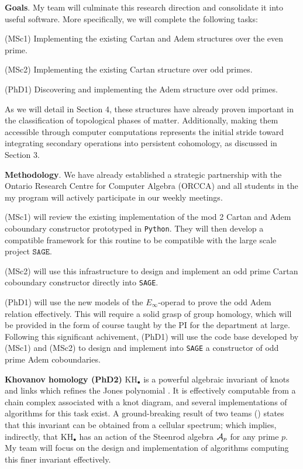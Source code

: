 \medskip\noindent\textbf{Goals}.
My team will culminate this research direction and consolidate it into useful software.
More specifically, we will complete the following tasks:

\smallskip\noindent(MSc1) Implementing the existing Cartan and Adem structures over the even prime.\par
\noindent(MSc2) Implementing the existing Cartan structure over odd primes.\par
\noindent(PhD1) Discovering and implementing the Adem structure over odd primes.

\smallskip\noindent As we will detail in Section 4, these structures have already proven important in the classification of topological phases of matter.
Additionally, making them accessible through computer computations represents the initial stride toward integrating secondary operations into persistent cohomology, as discussed in Section 3.

\smallskip\noindent\textbf{Methodology}.
We have already established a strategic partnership with the Ontario Research Centre for Computer Algebra (ORCCA) and all students in the my program will actively participate in our weekly meetings.

(MSc1) will review the existing implementation of the mod 2 Cartan and Adem coboundary constructor prototyped in \texttt{Python}.
They will then develop a compatible framework for this routine to be compatible with the large scale project $\texttt{SAGE}$.

(MSc2) will use this infrastructure to design and implement an odd prime Cartan coboundary constructor directly into \texttt{SAGE}.

(PhD1) will use the new models of the $E_\infty$-operad \cite{medina2020prop1} to prove the odd Adem relation effectively.
This will require a solid grasp of group homology, which will be provided in the form of course taught by the PI for the department at large.
Following this significant achivement, (PhD1) will use the code base developed by (MSc1) and (MSc2) to design and implement into \texttt{SAGE} a constructor of odd prime Adem coboundaries.

\medskip\noindent\textbf{{\sc Khovanov homology} (PhD2)}
$\mathrm{KH_\bullet}$ is a powerful algebraic invariant of knots and links which refines the Jones polynomial \cite{khovanov2000khovanov}.
It is effectively computable from a chain complex associated with a knot diagram, and several implementations of algorithms for this task exist.
A ground-breaking result of two teams (\cite{lipshitz2014khovanov,kriz2016khovanov}) states that this invariant can be obtained from a cellular spectrum; which implies, indirectly, that $\mathrm{KH_\bullet}$ has an action of the Steenrod algebra $\mathcal{A}_p$ for any prime $p$.
My team will focus on the design and implementation of algorithms computing this finer invariant effectively.


